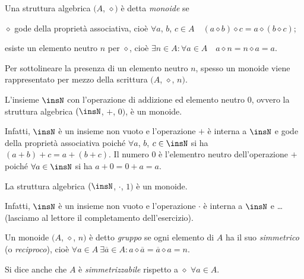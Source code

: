 \begin{definizione}
Una struttura algebrica $(A$, $\diamond)$ è detta \emph{monoide} se
\begin{itemize*}
\item $\diamond$ gode della proprietà associativa, cioè $\forall a$, $b$, $c \in A\quad (a \diamond b) \diamond c = a \diamond (b \diamond c)$;
\item esiste un elemento neutro $n$ per $\diamond$, cioè $\exists n \in A : \forall a \in A\quad a\diamond n = n \diamond a = a$.
\end{itemize*}
\end{definizione}

Per sottolineare la presenza di un elemento neutro $n$, spesso un monoide viene rappresentato per mezzo della scrittura $(A$, $\diamond$, $n)$.

\begin{exrig}
 \begin{esempio}
L'insieme $\insN$ con l'operazione di addizione ed elemento neutro 0, ovvero la struttura algebrica $(\insN$, $+$, $0)$, è un monoide.

Infatti, $\insN$ è un insieme non vuoto e l'operazione $+$ è interna a $\insN$ e gode della proprietà associativa poiché $\forall a$, $b$, $c\in\insN$ si ha $(a+b)+c=a+(b+c)$. Il numero 0 è l'elementro neutro dell'operazione $+$ poiché $\forall a\in\insN$ si ha $a+0=0+a=a$.
 \end{esempio}
 
 \begin{esempio}
La struttura algebrica $(\insN$, $\cdot$, $1)$ è un monoide.

Infatti, $\insN$ è un insieme non vuoto e l'operazione $\cdot$ è interna a $\insN$ e \ldots (lasciamo al lettore il completamento dell'esercizio).
 \end{esempio}
\end{exrig}

\begin{definizione}
Un monoide $(A$, $\diamond$, $n)$ è detto \emph{gruppo} se ogni elemento di $A$ ha il suo \emph{simmetrico} (o \emph{reciproco}), cioè $\forall a \in A\: \exists \overline{a} \in A : a\diamond\overline{a} = \overline{a}\diamond a = n$.

Si dice anche che $A$ è \emph{simmetrizzabile} rispetto a $\diamond$ $\forall a \in A$.
\end{definizione}

